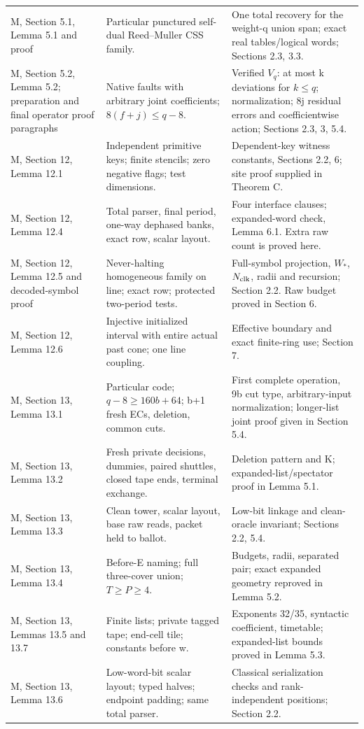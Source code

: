 \begin{longtable}{@{}>{\raggedright\arraybackslash}p{}>{\raggedright\arraybackslash}p{}>{\raggedright\arraybackslash}p{}@{}}
M, Section 5.1, Lemma 5.1 and proof & Particular punctured self-dual Reed--Muller CSS family. & One total recovery for the weight-q union span; exact real tables/logical words; Sections 2.3, 3.3.\\
M, Section 5.2, Lemma 5.2; preparation and final operator proof paragraphs & Native faults with arbitrary joint coefficients; $8(f+j)\le q-8$. & Verified $V_q$: at most k deviations for $k\le q$; normalization; 8j residual errors and coefficientwise action; Sections 2.3, 3, 5.4.\\
M, Section 12, Lemma 12.1 & Independent primitive keys; finite stencils; zero negative flags; test dimensions. & Dependent-key witness constants, Sections 2.2, 6; site proof supplied in Theorem C.\\
M, Section 12, Lemma 12.4 & Total parser, final period, one-way dephased banks, exact row, scalar layout. & Four interface clauses; expanded-word check, Lemma 6.1. Extra raw count is proved here.\\
M, Section 12, Lemma 12.5 and decoded-symbol proof & Never-halting homogeneous family on line; exact row; protected two-period tests. & Full-symbol projection, $W_*$, $N_{\rm clk}$, radii and recursion; Section 2.2. Raw budget proved in Section 6.\\
M, Section 12, Lemma 12.6 & Injective initialized interval with entire actual past cone; one line coupling. & Effective boundary and exact finite-ring use; Section 7.\\
M, Section 13, Lemma 13.1 & Particular code; $q-8\ge160b+64$; b+1 fresh ECs, deletion, common cuts. & First complete operation, 9b cut type, arbitrary-input normalization; longer-list joint proof given in Section 5.4.\\
M, Section 13, Lemma 13.2 & Fresh private decisions, dummies, paired shuttles, closed tape ends, terminal exchange. & Deletion pattern and K; expanded-list/spectator proof in Lemma 5.1.\\
M, Section 13, Lemma 13.3 & Clean tower, scalar layout, base raw reads, packet held to ballot. & Low-bit linkage and clean-oracle invariant; Sections 2.2, 5.4.\\
M, Section 13, Lemma 13.4 & Before-E naming; full three-cover union; $T\ge P\ge4$. & Budgets, radii, separated pair; exact expanded geometry reproved in Lemma 5.2.\\
M, Section 13, Lemmas 13.5 and 13.7 & Finite lists; private tagged tape; end-cell tile; constants before w. & Exponents 32/35, syntactic coefficient, timetable; expanded-list bounds proved in Lemma 5.3.\\
M, Section 13, Lemma 13.6 & Low-word-bit scalar layout; typed halves; endpoint padding; same total parser. & Classical serialization checks and rank-independent positions; Section 2.2.\\
\end{longtable}
\endgroup
